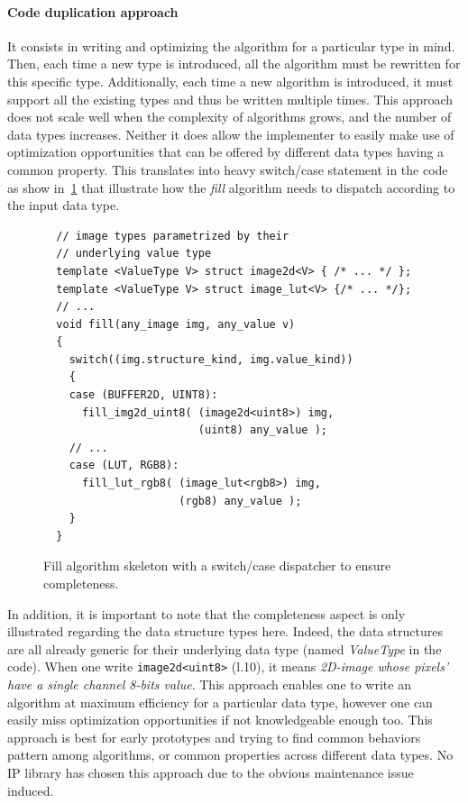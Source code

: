 \paragraph{Code duplication approach} It consists in writing and optimizing the algorithm for a particular type in mind.
Then, each time a new type is introduced, all the algorithm must be rewritten for this specific type. Additionally, each
time a new algorithm is introduced, it must support all the existing types and thus be written multiple times. This
approach does not scale well when the complexity of algorithms grows, and the number of data types increases. Neither it
does allow the implementer to easily make use of optimization opportunities that can be offered by different data types
having a common property. This translates into heavy switch/case statement in the code as show in~\ref{code:gen.exhau}
that illustrate how the \emph{fill} algorithm needs to dispatch according to the input data type.

\begin{figure}[htbp]
  \centering
  \begin{verbatim}
  // image types parametrized by their
  // underlying value type
  template <ValueType V> struct image2d<V> { /* ... */ };
  template <ValueType V> struct image_lut<V> {/* ... */};
  // ...
  void fill(any_image img, any_value v)
  {
    switch((img.structure_kind, img.value_kind))
    {
    case (BUFFER2D, UINT8):
      fill_img2d_uint8( (image2d<uint8>) img,
                        (uint8) any_value );
    // ...
    case (LUT, RGB8):
      fill_lut_rgb8( (image_lut<rgb8>) img,
                     (rgb8) any_value );
    }
  }
  \end{verbatim}
  \caption{Fill algorithm skeleton with a switch/case dispatcher to ensure completeness.}
  \label{code:gen.exhau}
\end{figure}

In addition, it is important to note that the completeness aspect is only illustrated regarding the data structure types
here. Indeed, the data structures are all already generic for their underlying data type (named \emph{ValueType} in the
code). When one write \texttt{image2d<uint8>} (l.10), it means \emph{2D-image whose pixels' have a single channel 8-bits
  value}. This approach enables one to write an algorithm at maximum efficiency for a particular data type, however one
can easily miss optimization opportunities if not knowledgeable enough too. This approach is best for early prototypes
and trying to find common behaviors pattern among algorithms, or common properties across different data types. No IP
library has chosen this approach due to the obvious maintenance issue induced.

